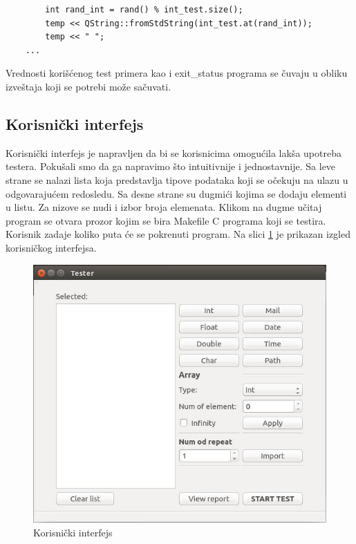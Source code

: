 \documentclass[a4paper]{article}
\begin{document}
{\begin{verbatim}
        int rand_int = rand() % int_test.size();
        temp << QString::fromStdString(int_test.at(rand_int));
        temp << " ";
    ...
\end{verbatim}

Vrednosti korišćenog test primera kao i exit\_status programa se čuvaju u obliku izveštaja koji se potrebi može sačuvati.

\subsection{Korisnički interfejs}
\label{subsec:korisnicki_interfejs_testera}

Korisnički interfejs je napravljen da bi se korisnicima omogućila lakša upotreba testera. Pokušali smo da ga napravimo što intuitivnije i jednostavnije. 
Sa leve strane se nalazi lista koja predstavlja tipove podataka koji se očekuju na ulazu u odgovarajućem redosledu. Sa desne strane su dugmići kojima se dodaju elementi u listu. Za nizove se nudi i izbor broja elemenata. Klikom na dugme učitaj program se otvara prozor kojim se bira Makefile C programa koji se testira. Korisnik zadaje koliko puta će se pokrenuti program. Na slici \ref{fig:interfejs} je prikazan izgled korisničkog interfejsa. \\

\begin{figure}[h!]
\begin{center}
\includegraphics[scale=0.5]{korisnicki_interfejs.jpg}
\end{center}
\caption{Korisnički interfejs}
\label{fig:interfejs}
\end{figure}

}
\end{document}
